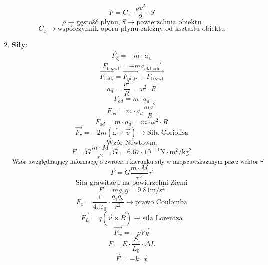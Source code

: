 \documentclass{article}
\begin{document}
\begin{enumerate}
		\[
		F = C_x \cdot \frac{\rho v^2}{2} \cdot S
		\]
		\[
		\rho \rightarrow \text{gęstość płynu}, S \rightarrow \text{powierzchnia obiektu}
		\]
		\[
		C_x \rightarrow \text{współczynnik oporu płynu zależny od kształtu obiektu}
		\]
		\item \textbf{Siły}:
		\[
		\vec{F}_b = -m \cdot \vec{a}_u
		\]
		\[
		\overrightarrow{F_{\text{bezwł}}} = -m \overrightarrow{a_{\text{ukł odn}}}
		\]
		\[
		\overrightarrow{F_{\text{całk}}} = \overrightarrow{F_{\text{oddz}}} + \overrightarrow{F_{\text{bezwł}}}
		\]
		\[
		a_d = \frac{v^2}{R} = \omega^2 \cdot R
		\]
		\[
		F_{od} = m \cdot a_d
		\]
		\[
		F_{od} = m \cdot a_d \frac{mv^2}{R}
		\]
		\[
		F_{od} = m \cdot a_d = m \cdot \omega^2 \cdot R
		\]
		\[
		\overrightarrow{F_c} = -2m(\vec{\omega} \times \vec{v}) \longrightarrow \text{Siła Coriolisa}
		\]
		\[
		\text{Wzór Newtowna}
		\]
		\[
		F = G \frac{m \cdot M}{r^2}, G = 6.67 \cdot 10^{-11} \text{N} \cdot \text{m}^2 / \text{kg}^2
		\]
		$
			\text{Wzór uwzględniający informację o zwrocie i kierunku siły w miejscu} 	\newline 
			\text{wskazanym przez wektor } \vec{r}
		$
		\[
		\vec{F} = G \frac{m \cdot M}{r^3} \vec{r}
		\]
		\[
		\text{Siła grawitacji na powierzchni Ziemi}
		\]
		\[
		F = mg, g = 9.81 \text{m} / \text{s}^2 
		\]
		\[
		F_c = \frac{1}{4 \pi \varepsilon_0} \cdot \frac{q_1 q_2}{r^2} \longrightarrow \text{prawo Coulomba}
		\]
		\[
		\overrightarrow{F_L} =  q(\vec{v} \times \vec{B}) \longrightarrow \text{siła Lorentza}
		\]
		\[
		\overrightarrow{F_w} = -\rho V \vec{g}
		\]
		\[
		F = E \cdot \frac{S}{L_0} \cdot \Delta L
		\]
		\[
		\vec{F} = -k \cdot \vec{x}
		\]
		
	\end{enumerate}
	
\end{document}
